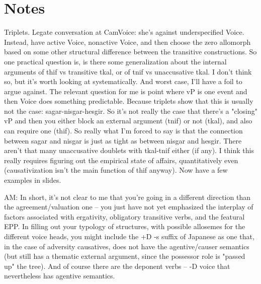 \section{Notes}
Triplets.
Legate conversation at CamVoice: she's against underspecified Voice. Instead, have active Voice, nonactive Voice, and then choose the zero allomorph based on some other structural difference between the transitive constructions. So one practical question is, is there some generalization about the internal arguments of thif vs transitive tkal, or of tnif vs unaccusative tkal.
	I don't think so, but it's worth looking at systematically. And worst case, I'll have a foil to argue against.
	The relevant question for me is point where vP is one event and then Voice does something predictable. Because triplets show that this is usually not the case: sagar-nisgar-hesgir. So it's not really the case that there's a "closing" vP and then you either block an external argument (tnif) or not (tkal), and also can require one (thif).
	So really what I'm forced to say is that the connection between sagar and nisgar is just as tight as between nisgar and hesgir.
	There aren't that many unaccusative doublets with tkal-tnif either (if any).
	I think this really requires figuring out the empirical state of affairs, quantitatively even (causativization isn't the main function of thif anyway).
	Now have a few examples in slides.

AM:  In short, it's not clear to me that you're going in a different direction than the agreement/valuation one -- you just have not yet emphasized the interplay of factors associated with ergativity, obligatory transitive verbs, and the featural EPP.
In filling out your typology of structures, with possible allosemes for the different voice heads, you might include the +D -s suffix of Japanese as one that, in the case of adversity causatives, does not have the agentive/causer semantics (but still has a thematic external argument, since the possessor role is "passed up" the tree).
And of course there are the deponent verbs --  -D voice that nevertheless has agentive semantics.